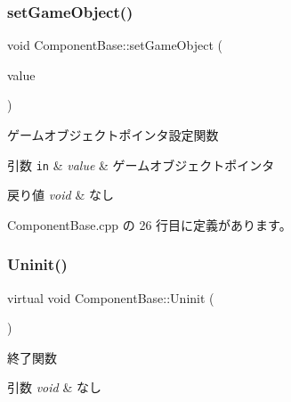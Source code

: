 \mbox{\label{class_component_base_ae671317076d3c89ba0793ae2cd34d5ea}} 
\subsubsection{\texorpdfstring{set\+Game\+Object()}{setGameObject()}}
{\footnotesize\ttfamily void Component\+Base\+::set\+Game\+Object (\begin{DoxyParamCaption}\item[{\mbox{\hyperlink{class_game_object_base}{Game\+Object\+Base}} $\ast$}]{value }\end{DoxyParamCaption})}



ゲームオブジェクトポインタ設定関数 


\begin{DoxyParams}[1]{引数}
\mbox{\tt in}  & {\em value} & ゲームオブジェクトポインタ \\
\hline
\end{DoxyParams}

\begin{DoxyRetVals}{戻り値}
{\em void} & なし \\
\hline
\end{DoxyRetVals}


 Component\+Base.\+cpp の 26 行目に定義があります。

\mbox{\label{class_component_base_a9f42beaf0383d6f629819579cab4de57}} 
\subsubsection{\texorpdfstring{Uninit()}{Uninit()}}
{\footnotesize\ttfamily virtual void Component\+Base\+::\+Uninit (\begin{DoxyParamCaption}{ }\end{DoxyParamCaption})\hspace{0.3cm}{\ttfamily [pure virtual]}}



終了関数 


\begin{DoxyParams}{引数}
{\em void} & なし \\
\hline
\end{DoxyParams}

